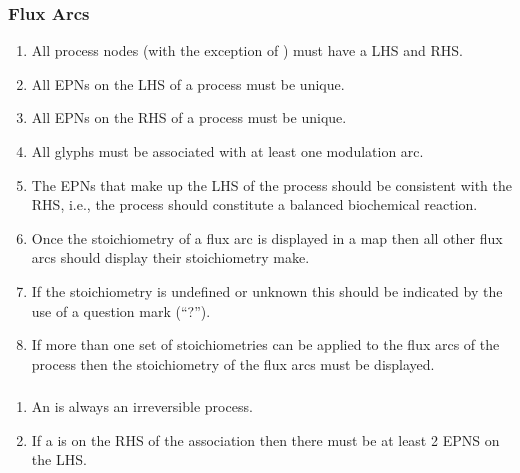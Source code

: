 \subsubsection{Flux Arcs}

\begin{enumerate}
\item All process nodes (with the exception of ) must have a LHS and RHS.
    \item All EPNs on the LHS of a process must be unique.
    \item All EPNs on the RHS of a process must be unique.
    \item All  glyphs must be associated with at least one modulation arc.
    \item The EPNs that make up the LHS of the process should be consistent with the RHS, i.e., the process should constitute a    balanced biochemical reaction.
    \item Once the stoichiometry of a flux arc is displayed in a map then all other flux arcs should
    display their stoichiometry make.
    \item If the stoichiometry is undefined or unknown this should be indicated by the use of a question mark (``?''). 
   \item If more than one set of stoichiometries can be applied to the flux arcs of the process then the stoichiometry of the flux arcs must be displayed.
\end{enumerate}  

\subsubsection{}

  \begin{enumerate}
    \item An  is always an irreversible process.
    \item If a  is on the RHS of the association then
  there must be at least 2 EPNS on the LHS.
\end{enumerate}  


